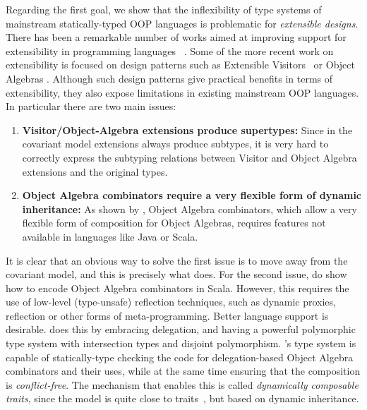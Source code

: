 Regarding the first goal, we show that the inflexibility of type systems of
mainstream statically-typed OOP languages is problematic for
\emph{extensible designs}.
There has been a remarkable number of works aimed at improving support
for extensibility in programming languages
~\cite{Prehofer97,Tarr99ndegrees,Harrison93subject,McDirmid01Jiazzi,Aracic06CaesarJ,Smaragdakis98mixin,nystrom2006j,togersen:2004,Zenger-Odersky2005,oliveira09modular,oliveira2012extensibility}. 
Some of the more recent work on extensibility is focused on design
patterns such as Extensible
Visitors~\cite{togersen:2004,oliveira09modular} or Object Algebras
\cite{oliveira2012extensibility}. 
Although such design patterns give practical benefits in terms of
extensibility, they also expose limitations in existing mainstream OOP
languages. In particular there are two main issues:

\begin{enumerate}

\item {\bf Visitor/Object-Algebra extensions produce supertypes:}
  Since in the covariant model extensions always produce subtypes, it
  is very hard to correctly express the subtyping relations between
  Visitor and Object Algebra extensions and the original types.

\item {\bf Object Algebra combinators require a very flexible form of
    dynamic inheritance:} As shown by \citet{oliveira2013feature,rendel14attributes}, Object Algebra
  combinators, which allow a very flexible form of composition for
  Object Algebras, requires features not available in languages like
  Java or Scala.

\end{enumerate}

It is clear that an obvious way to solve the first issue is to 
move away from the covariant model, and this is precisely what \name does. 
For the second issue, \citet{oliveira2013feature,rendel14attributes}
do show how to encode Object Algebra combinators in Scala. 
However, this requires the
use of low-level (type-unsafe) reflection techniques, such as dynamic proxies,
reflection or other forms of meta-programming. Better language support is desirable. \name does 
this by embracing delegation, and having a powerful polymorphic type
system with intersection types and disjoint polymorphism. \name's type
system is capable of statically-type checking the code for 
delegation-based Object Algebra combinators and their uses, while at
the same time ensuring that the composition is \emph{conflict-free}.
The mechanism that enables this is called \emph{dynamically composable
  traits}, since the model is quite close to traits~\cite{}, but based on
dynamic inheritance. 

